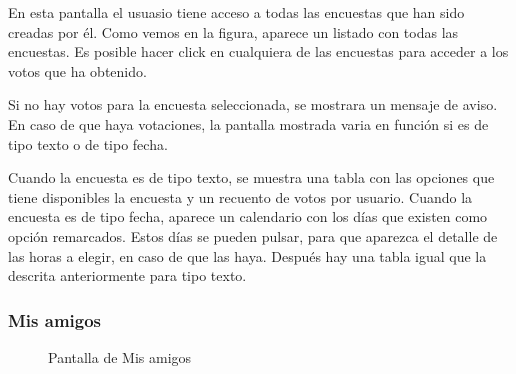 \documentclass[a4paper, 12pt]{book}
\begin{document}
En esta pantalla el usuasio tiene acceso a todas las encuestas que han sido creadas por \'el.
Como vemos en la figura, aparece un listado con todas las encuestas. Es posible hacer click en
cualquiera de las encuestas para acceder a los votos que ha obtenido.

Si no hay votos para la encuesta seleccionada, se mostrara un mensaje de aviso. En caso de que haya
votaciones, la pantalla mostrada varia en funci\'on si es de tipo texto o de tipo fecha.

Cuando la encuesta es de tipo texto, se muestra una tabla con las opciones que tiene disponibles la encuesta
y un recuento de votos por usuario. Cuando la encuesta es de tipo fecha, aparece un calendario con los d\'ias
que existen como opci\'on remarcados. Estos d\'ias se pueden pulsar, para que aparezca el detalle de las horas
a elegir, en caso de que las haya. Despu\'es hay una tabla igual que la descrita anteriormente para tipo texto.




\subsubsection{Mis amigos}
\label{sec:mis_amigos}

\begin{figure}[H]
 \centering
 \caption{Pantalla de Mis amigos}
 \label{f:mis_amigos}
\end{figure}
\end{document}
